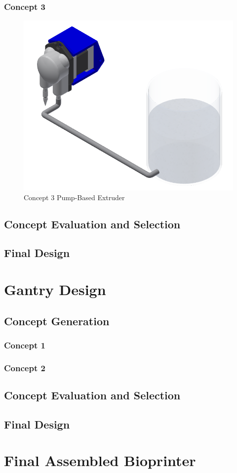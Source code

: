 \subsubsection*{Concept 3}
\begin{figure}[H]
    \centering
    \includegraphics[scale=1]{figs/PumpConcept.png}
    \caption{Concept 3 Pump-Based Extruder}
    \label{fig:extruderConcept3}
\end{figure}
\subsection{Concept Evaluation and Selection}
\subsection{Final Design}


\section{Gantry Design}
\subsection{Concept Generation}
\subsubsection*{Concept 1}
\subsubsection*{Concept 2}
\subsection{Concept Evaluation and Selection}
\subsection{Final Design}


\section{Final Assembled Bioprinter}